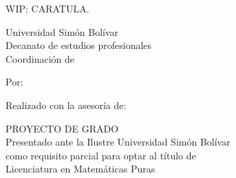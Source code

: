 

\caratulafalse
\paginatitulotrue
\resumentrue
\dedicatoriafalse
\agradecimientosfalse
\listastrue
\toctrue
\introtrue
{}
\basicostrue
\mainproofstrue



\frontmatter
\ifcaratula\newpage
WIP: CARATULA.
\fi
\ifpaginatitulo\newpage
\bgroup
    \centering
    \thispagestyle{empty}

    \PrintUsbLogo
    {
        Universidad Simón Bolívar\\
        Decanato de estudios profesionales\\
        Coordinación de \coord
    }

    \vspace{1.5cm}

    \UppercaseBold{
        \wrapto[14cm][\centering]
        {\MainTitle}
    }

    \vspace{1.5cm}

    Por:
    \\
    \autor

    \vspace{1.5cm}

    Realizado con la asesoría de:
    \\
    \tutor

    \vspace{3cm}

    \MakeUppercase{Proyecto de Grado}\\
    Presentado ante la Ilustre Universidad Simón Bolívar\\
    como requisito parcial para optar al título de\\
    Licenciatura en Matemáticas Puras

    \vspace{\fill}

